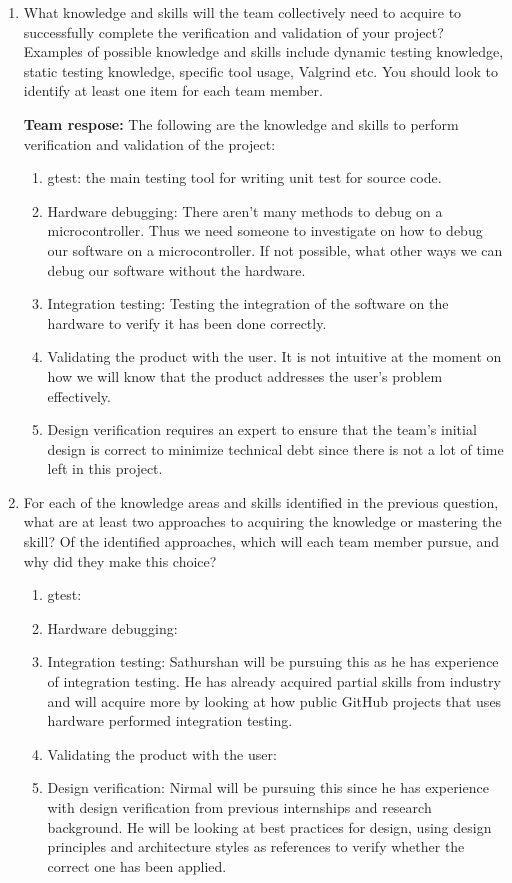 \documentclass[12pt, titlepage]{article}
\begin{document}
\begin{enumerate}
  \item What knowledge and skills will the team collectively need to acquire to
  successfully complete the verification and validation of your project?
  Examples of possible knowledge and skills include dynamic testing knowledge,
  static testing knowledge, specific tool usage, Valgrind etc.  You should look
  to identify at least one item for each team member.
  
  \textbf{Team respose:} The following are the knowledge and skills to perform
  verification and validation of the project:

  \begin{enumerate}
    \item gtest: the main testing tool for writing unit test for source code.
    \item Hardware debugging: There aren't many methods to debug on a
    microcontroller. Thus we need someone to investigate on how to debug our
    software on a microcontroller. If not possible, what other ways we can debug
    our software without the hardware.
    \item Integration testing: Testing the integration of the software on the
    hardware to verify it has been done correctly.
    \item Validating the product with the user. It is not intuitive at the
    moment on how we will know that the product addresses the user's problem
    effectively.
    \item Design verification requires an expert to ensure that the team's
    initial design is correct to minimize technical debt since there is not
    a lot of time left in this project.
  \end{enumerate}

  \item For each of the knowledge areas and skills identified in the previous
  question, what are at least two approaches to acquiring the knowledge or
  mastering the skill?  Of the identified approaches, which will each team
  member pursue, and why did they make this choice?

  \begin{enumerate}
    \item gtest:
    \item Hardware debugging: 
    \item Integration testing: Sathurshan will be pursuing this as he has
    experience of integration testing. He has already acquired partial skills
    from industry and will acquire more by looking at how public GitHub projects
    that uses hardware performed integration testing.
    \item Validating the product with the user:
    \item Design verification: Nirmal will be pursuing this since he has 
    experience with design verification from previous internships and research 
    background. He will be looking at best practices for design, using design 
    principles and architecture styles as references to verify whether the 
    correct one has been applied. 
  \end{enumerate}
\end{enumerate}
\end{document}
